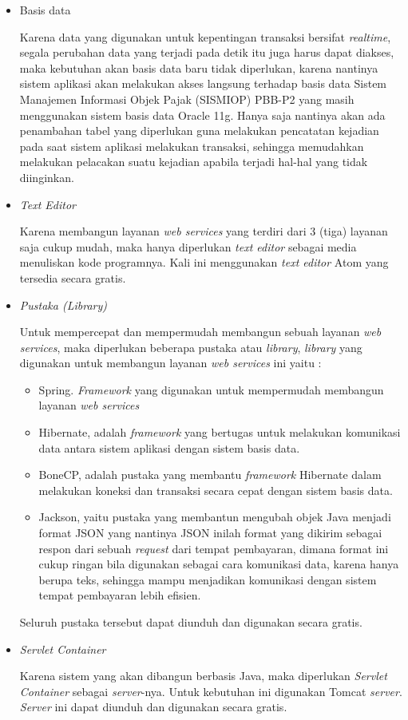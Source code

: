 \documentclass[pdftex, 12pt, oneside]{article}
\begin{document}
\begin{itemize}
  \item Basis data
  
  Karena data yang digunakan untuk kepentingan transaksi bersifat \textit{realtime}, segala perubahan data yang terjadi pada detik itu juga harus dapat diakses, maka kebutuhan akan basis data baru tidak diperlukan, karena nantinya sistem aplikasi akan melakukan akses langsung terhadap basis data Sistem Manajemen Informasi Objek Pajak (SISMIOP) PBB-P2 yang masih menggunakan sistem basis data Oracle 11g. Hanya saja nantinya akan ada penambahan tabel yang diperlukan guna melakukan pencatatan kejadian pada saat sistem aplikasi melakukan transaksi, sehingga memudahkan melakukan pelacakan suatu kejadian apabila terjadi hal-hal yang tidak diinginkan.
  
  \item \textit{Text Editor}
  
  Karena membangun layanan \textit{web services} yang terdiri dari 3 (tiga) layanan saja cukup mudah, maka hanya diperlukan \textit{text editor} sebagai media menuliskan kode programnya. Kali ini menggunakan \textit{text editor} Atom yang tersedia secara gratis.
  
  \item \textit{Pustaka (\textit{Library})}
  
  Untuk mempercepat dan mempermudah membangun sebuah layanan \textit{web services}, maka diperlukan beberapa pustaka atau \textit{library}, \textit{library} yang digunakan untuk membangun layanan \textit{web services} ini yaitu :
  
  \begin{itemize}
    \item Spring. \textit{Framework} yang digunakan untuk mempermudah membangun layanan \textit{web services}
    \item Hibernate, adalah \textit{framework} yang bertugas untuk melakukan komunikasi data antara sistem aplikasi dengan sistem basis data.
    \item BoneCP, adalah pustaka yang membantu \textit{framework} Hibernate dalam melakukan koneksi dan transaksi secara cepat dengan sistem basis data.
    \item Jackson, yaitu pustaka yang membantun mengubah objek Java menjadi format JSON yang nantinya JSON inilah format yang dikirim sebagai respon dari sebuah \textit{request} dari tempat pembayaran, dimana format ini cukup ringan bila digunakan sebagai cara komunikasi data, karena hanya berupa teks, sehingga mampu menjadikan komunikasi dengan sistem tempat pembayaran lebih efisien.
  \end{itemize}
  
  Seluruh pustaka tersebut dapat diunduh dan digunakan secara gratis.
  
  \item \textit{Servlet Container}
  
  Karena sistem yang akan dibangun berbasis Java, maka diperlukan \textit{Servlet Container} sebagai \textit{server}-nya. Untuk kebutuhan ini digunakan Tomcat \textit{server}. \textit{Server} ini dapat diunduh dan digunakan secara gratis.
  
\end{itemize}
\end{document}
